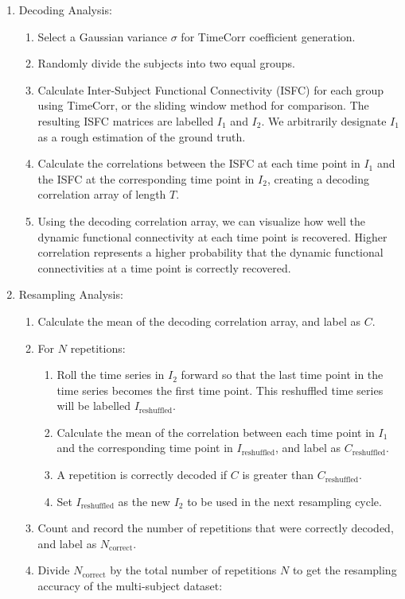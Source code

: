 \documentclass[11pt]{article}
\begin{document}
\begin{enumerate}
\item Decoding Analysis:
\begin{enumerate}
\item Select a Gaussian variance $\sigma$ for TimeCorr coefficient generation.
\item Randomly divide the subjects into two equal groups.
\item Calculate Inter-Subject Functional Connectivity (ISFC) for each group using TimeCorr, or the sliding window method for comparison. The resulting ISFC matrices are labelled $I_1$ and $I_2$. We arbitrarily designate $I_1$ as a rough estimation of the ground truth.
\item Calculate the correlations between the ISFC at each time point in $I_1$ and the ISFC at the corresponding time point in $I_2$, creating a decoding correlation array of length $T$.
\item Using the decoding correlation array, we can visualize how well the dynamic functional connectivity at each time point is recovered. Higher correlation represents a higher probability that the dynamic functional connectivities at a time point is correctly recovered.
\end{enumerate}
\item Resampling Analysis:
\begin{enumerate}
\item Calculate the mean of the decoding correlation array, and label as $C$.
\item For $N$ repetitions:
\begin{enumerate}
\item Roll the time series in $I_2$ forward so that the last time point in the time series becomes the first time point. This reshuffled time series will be labelled $I_{\text{reshuffled}}$.
\item Calculate the mean of the correlation between each time point in $I_1$ and the corresponding time point in $I_{\text{reshuffled}}$, and label as $C_{\text{reshuffled}}$.
\item A repetition is correctly decoded if $C$ is greater than $C_{\text{reshuffled}}$.
\item Set $I_{\text{reshuffled}}$ as the new $I_2$ to be used in the next resampling cycle.
\end{enumerate}
\item Count and record the number of repetitions that were correctly decoded, and label as $N_{\text{correct}}$.
\item Divide $N_{\text{correct}}$ by the total number of repetitions $N$ to get the resampling accuracy of the multi-subject dataset:

\end{enumerate}
\end{enumerate}
\end{document}
